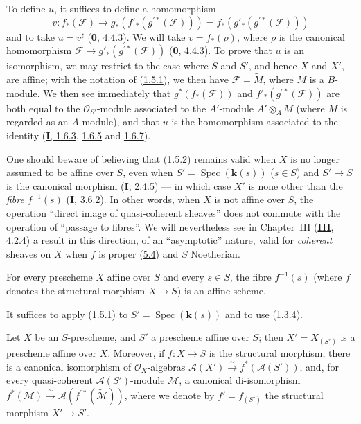 To define $u$, it suffices to define a homomorphism
\[
  v:f_*(\mathcal{F})\longrightarrow
  g_*(f'_*(g^{\prime*}(\mathcal{F})))
  =f_*(g'_*(g^{\prime*}(\mathcal{F})))
\]
and to take $u=v^\sharp$ (\hyperref[0.4.4.3]{\textbf{0}, 4.4.3}). We will take
$v=f_*(\rho)$, where $\rho$ is the canonical homomorphism
$\mathcal{F}\to g'_*(g^{\prime*}(\mathcal{F}))$
(\hyperref[0.4.4.3]{\textbf{0}, 4.4.3}). To prove that $u$ is an isomorphism,
we may restrict to the case where $S$ and $S'$, and hence $X$ and $X'$, are
affine; with the notation of (\hyperref[II.1.5.1]{1.5.1}), we then have
$\mathcal{F}=\widetilde{M}$, where $M$ is a $B$-module. We then see
immediately that $g^*(f_*(\mathcal{F}))$ and
$f'_*(g^{\prime*}(\mathcal{F}))$ are both equal to the
$\mathcal{O}_{S'}$-module associated to the $A'$-module $A'\otimes_A M$
(where $M$ is regarded as an $A$-module), and that $u$ is the homomorphism
associated to the identity (\hyperref[I.1.6.3]{\textbf{I}, 1.6.3},
\hyperref[I.1.6.5]{1.6.5} and \hyperref[I.1.6.7]{1.6.7}).

\begin{remark}[1.5.3]
\label{II.1.5.3}
One should beware of believing that (\hyperref[II.1.5.2]{1.5.2}) remains
valid when $X$ is no longer assumed to be affine over $S$, even when
$S'=\operatorname{Spec}(\boldsymbol{k}(s))$ ($s\in S$) and $S'\to S$ is the
canonical morphism (\hyperref[I.2.4.5]{\textbf{I}, 2.4.5}) --- in which case $X'$
is none other than the \emph{fibre} $f^{-1}(s)$
(\hyperref[I.3.6.2]{\textbf{I}, 3.6.2}). In other words, when $X$ is not affine
over $S$, the operation
``direct image of quasi-coherent sheaves'' does not commute with the
operation of ``passage to fibres''. We will nevertheless see in Chapter~III
(\hyperref[III.4.2.4]{\textbf{III}, 4.2.4}) a result in this direction, of an
``asymptotic'' nature, valid for \emph{coherent} sheaves on $X$ when
$f$ is proper (\hyperref[II.5.4]{5.4}) and $S$ Noetherian.
\end{remark}

\begin{corollary}[1.5.4]
\label{II.1.5.4}
For every prescheme $X$ affine over $S$ and every $s\in S$, the fibre
$f^{-1}(s)$ (where $f$ denotes the structural morphism $X\to S$) is an
affine scheme.
\end{corollary}

It suffices to apply (\hyperref[II.1.5.1]{1.5.1}) to
$S'=\operatorname{Spec}(\boldsymbol{k}(s))$ and to use
(\hyperref[II.1.3.4]{1.3.4}).

\begin{corollary}[1.5.5]
\label{II.1.5.5}
Let $X$ be an $S$-prescheme, and $S'$ a prescheme affine over $S$; then
$X'=X_{(S')}$ is a prescheme affine over $X$. Moreover, if
$f:X\to S$ is the structural morphism, there is a canonical isomorphism of
$\mathcal{O}_X$-algebras
$\mathcal{A}(X')\xrightarrow{\sim}f^*(\mathcal{A}(S'))$, and, for every
quasi-coherent $\mathcal{A}(S')$-module $\mathcal{M}$, a canonical
di-isomorphism
$f^*(\mathcal{M})\xrightarrow{\sim}
\mathcal{A}(f^{\prime*}(\widetilde{\mathcal{M}}))$, where we denote by
$f'=f_{(S')}$ the structural morphism $X'\to S'$.
\end{corollary}

